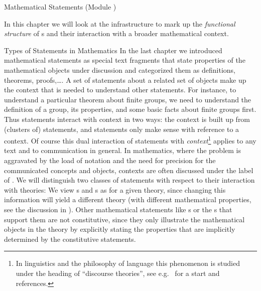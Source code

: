 
\begin{tchapter}[id=statements,short=Mathematical Statements]{Mathematical Statements (Module {})}

  In this chapter we will look at the {\omdoc} infrastructure to mark up the
  {\emph{functional structure}} of {s} and their
  interaction with a broader mathematical context.
  
\begin{tsection}[id=statements-constitutive]{Types of Statements in Mathematics}
  In the last chapter we introduced mathematical statements as special text fragments that
  state properties of the mathematical objects under discussion and categorized them as
  definitions, theorems, proofs,\ldots. A set of statements about a related set of objects
  make up the context that is needed to understand other statements.  For instance, to
  understand a particular theorem about finite groups, we need to understand the
  definition of a group, its properties, and some basic facts about finite groups
  first. Thus statements interact with context in two ways: the context is built up from
  (clusters of) statements, and statements only make sense with reference to a context. Of
  course this dual interaction of statements with {\emph{context}}\footnote{In linguistics
    and the philosophy of language this phenomenon is studied under the heading of
    ``discourse theories{}'', see e.g.~\cite{KamRey:fdtl93} for a
    start and references.}  applies to any text and to communication in general. In
  mathematics, where the problem is aggravated by the load of notation and the need for
  precision for the communicated concepts and objects, contexts are often discussed under
  the label of {}. We will
  distinguish two classes of statements with respect to their interaction with theories:
  We view {s} and {s} as {} for a
  given theory, since changing this information will yield a different theory (with
  different mathematical properties, see the discussion in {}).  Other
  mathematical statements like {s} or the {s} that
  support them are not constitutive, since they only illustrate the mathematical objects
  in the theory by explicitly stating the properties that are implicitly determined by the
  constitutive statements.
  

\end{tsection}
\end{tchapter}
